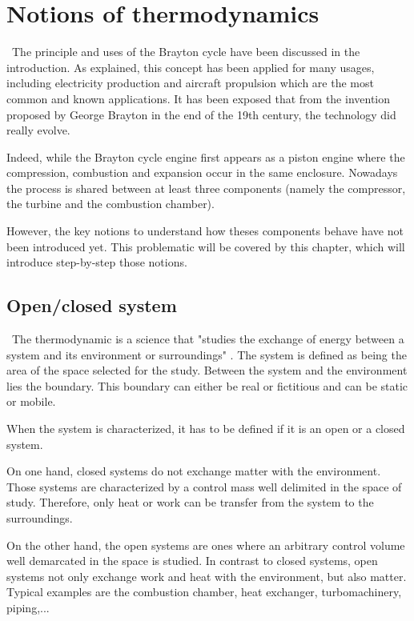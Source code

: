 \graphicspath{{Chapitre_2/Images/}}
\chapter{Notions of thermodynamics}\label{C2}
\quad\, The principle and uses of the Brayton cycle have been discussed in the introduction. As explained, this concept has been applied for many usages, including electricity production and aircraft propulsion which are the most common and known applications. It has been exposed that from the invention proposed by George Brayton in the end of the 19th century, the technology did really evolve.

Indeed, while the Brayton cycle engine first appears as a  piston engine where the compression, combustion and expansion occur in the same enclosure. Nowadays
the process is shared between at least three components (namely the compressor, the turbine and the combustion chamber).

However, the key notions to understand how theses components behave have not been introduced yet. This problematic will be covered by this chapter, which will introduce step-by-step those notions.
\section{Open/closed system}\label{sect:C2_Sys}
\quad\,  The thermodynamic is a science that "studies the exchange of energy between a system and its environment or surroundings" \cite{thermoApp_1}.
The system is defined as being the area of the space selected for the study. Between the system and the environment lies the boundary. This boundary can either be real or fictitious and can be static or mobile.

When the system is characterized, it has to be defined if it is an open or a closed system.

On one hand, closed systems do not exchange matter with the environment. Those systems are characterized by a control mass well delimited in the space of study. Therefore, only heat or work can be transfer from the system to the surroundings.

On the other hand, the open systems are ones where an arbitrary control volume well demarcated in the space is studied. In contrast to closed systems, open systems not only exchange work and heat with the environment, but also matter. Typical examples are the combustion chamber, heat exchanger, turbomachinery, piping,...

